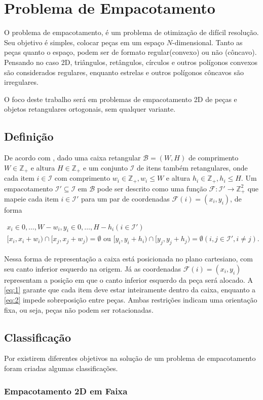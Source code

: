 \chapter{Problema de Empacotamento}\label{ch:problema-de-empacotamento}

O problema de empacotamento, é um problema de otimização de difícil resolução.
Seu objetivo é simples, colocar peças em um espaço $N$-dimensional.
Tanto as peças quanto o espaço, podem ser de formato regular(convexo) ou não (côncavo).
Pensando no caso 2D, triângulos, retângulos, círculos e outros polígonos convexos são considerados regulares, enquanto estrelas e outros polígonos côncavos são irregulares.

O foco deste trabalho será em problemas de empacotamento 2D de peças e objetos retangulares ortogonais, sem qualquer variante.


\section{Definição}\label{sec:definicao}

De acordo com \citeauthor{2DPackLib}, dado uma caixa retangular $\mathcal{B} = (W, H)$ de comprimento $W \in \mathbb{Z}_+$ e altura $H \in \mathbb{Z}_+$ e um conjunto $\mathcal{I}$ de itens também retangulares, onde cada item $i \in \mathcal{I}$ com comprimento $w_i \in \mathbb{Z}_+, w_i \le W$ e altura $h_i \in \mathbb{Z}_+, h_i \le H$.
Um empacotamento $\mathcal{I}' \subseteq \mathcal{I}$ em $\mathcal{B}$ pode ser descrito como uma função $\mathcal{F}: \mathcal{I}' \to \mathbb{Z}_+^2$ que mapeie cada item $i \in \mathcal{I}'$ para um par de coordenadas $\mathcal{F}(i) = (x_i, y_i)$, de forma

\begin{align}
    x_i \in {0, \dots, W - w_i}, y_i \in {0, \dots, H - h_i} (i \in \mathcal{I}') \label{eq:1} \\
    [x_i, x_i + w_i) \cap [x_j, x_j + w_j) = \emptyset \text{ ou } [y_i, y_i + h_i) \cap [y_j, y_j + h_j) = \emptyset (i, j \in \mathcal{I}', i \neq j) \label{eq:2}.
\end{align}

Nessa forma de representação a caixa está posicionada no plano cartesiano, com seu canto inferior esquerdo na origem.
Já as coordenadas $\mathcal{F}(i) = (x_i, y_i)$ representam a posição em que o canto inferior esquerdo da peça será alocado.
A \autoref{eq:1} garante que cada item deve estar inteiramente dentro da caixa, enquanto a \autoref{eq:2} impede sobreposição entre peças.
Ambas restrições indicam uma orientação fixa, ou seja, peças não podem ser rotacionadas.


\section{Classificação}\label{sec:classificacao}

Por existirem diferentes objetivos na solução de um problema de empacotamento foram criadas algumas classificações.

\subsection{Empacotamento 2D em Faixa}\label{subsec:empacotamento-2d-em-faixa}

